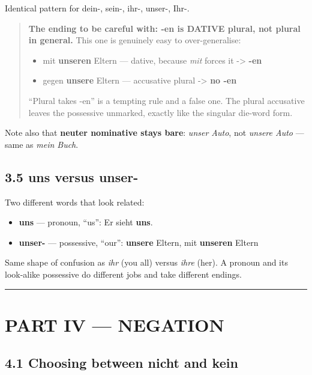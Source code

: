 \documentclass[
  11pt,
]{article}
\providecommand{\tightlist}{%
  \setlength{\itemsep}{0pt}\setlength{\parskip}{0pt}}
\begin{document}
Identical pattern for dein-, sein-, ihr-, unser-, Ihr-.

\begin{quote}
\textbf{The ending to be careful with: -en is DATIVE plural, not plural
in general.} This one is genuinely easy to over-generalise:

\begin{itemize}
\tightlist
\item
  mit \textbf{unseren} Eltern --- dative, because \emph{mit} forces it
  -\textgreater{} \textbf{-en}
\item
  gegen \textbf{unsere} Eltern --- accusative plural -\textgreater{}
  \textbf{no -en}
\end{itemize}

``Plural takes -en'' is a tempting rule and a false one. The plural
accusative leaves the possessive unmarked, exactly like the singular
die-word form.
\end{quote}

Note also that \textbf{neuter nominative stays bare}: \emph{unser Auto},
not \emph{unsere Auto} --- same as \emph{mein Buch}.

\subsection{3.5 uns versus unser-}\label{uns-versus-unser-}

Two different words that look related:

\begin{itemize}
\tightlist
\item
  \textbf{uns} --- pronoun, ``us'': Er sieht \textbf{uns}.
\item
  \textbf{unser-} --- possessive, ``our'': \textbf{unsere} Eltern, mit
  \textbf{unseren} Eltern
\end{itemize}

Same shape of confusion as \emph{ihr} (you all) versus \emph{ihre}
(her). A pronoun and its look-alike possessive do different jobs and
take different endings.

\begin{center}\rule{0.5\linewidth}{0.5pt}\end{center}

\section{PART IV --- NEGATION}\label{part-iv-negation}

\subsection{4.1 Choosing between nicht and
kein}\label{choosing-between-nicht-and-kein}
\end{document}
